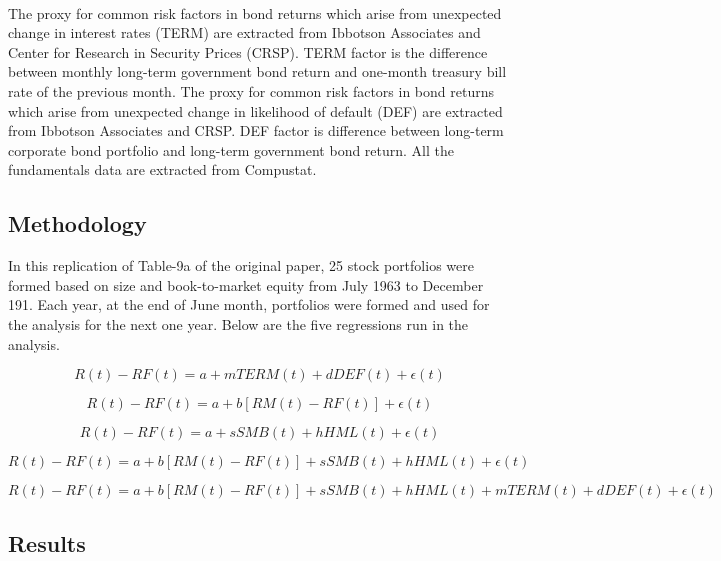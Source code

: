 \documentclass[11pt]{article}
\begin{document}
\paragraph{} The proxy for common risk factors in bond returns which arise from unexpected change in interest rates (TERM) are extracted from Ibbotson Associates and Center for Research in Security Prices (CRSP). TERM factor is the difference between monthly long-term government bond return and one-month treasury bill rate of the previous month. The proxy for common risk factors in bond returns which arise from unexpected change in likelihood of default (DEF) are extracted from Ibbotson Associates and CRSP. DEF factor is difference between long-term corporate bond portfolio and long-term government bond return. All the fundamentals data are extracted from Compustat.

\subsection{Methodology}

In this replication of Table-9a of the original paper, 25 stock portfolios were formed based on size and book-to-market equity from July 1963 to December 191. Each year, at the end of June month, portfolios were formed and used for the analysis for the next one year. Below are the five regressions run in the analysis.

\begin{equation}
    R(t)-RF(t) = a +mTERM(t)+dDEF(t)+\epsilon(t)
\end{equation}

\begin{equation}
R(t)-RF(t) = a +b[RM(t)-RF(t)]+\epsilon(t) 
\end{equation}

\begin{equation}
R(t)-RF(t) = a +sSMB(t)+ hHML(t)+\epsilon(t) 
\end{equation}

\begin{equation}
R(t)-RF(t) = a +b[RM(t)-RF(t)]+sSMB(t)+ hHML(t)+\epsilon(t) \end{equation}

\begin{equation}
R(t)-RF(t) = a +b[RM(t)-RF(t)]+sSMB(t)+ hHML(t)+mTERM(t)+dDEF(t)+\epsilon(t) 
\end{equation}

\subsection{Results}
\end{document}
